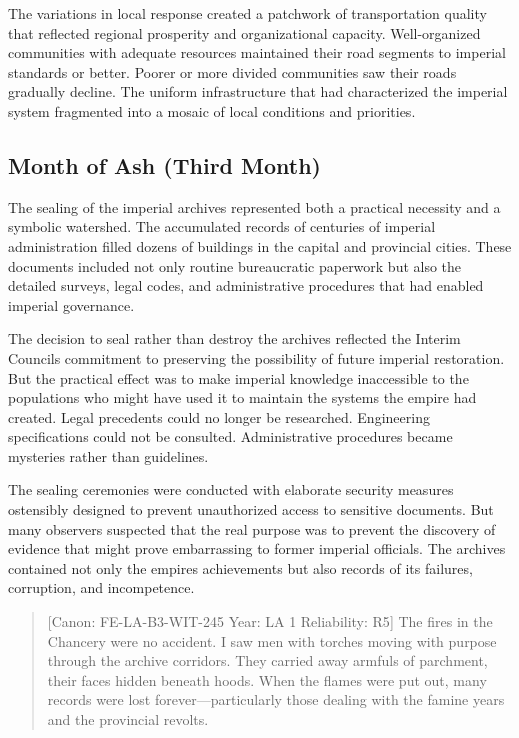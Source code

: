 The variations in local response created a patchwork of transportation
quality that reflected regional prosperity and organizational capacity.
Well-organized communities with adequate resources maintained their road
segments to imperial standards or better. Poorer or more divided
communities saw their roads gradually decline. The uniform
infrastructure that had characterized the imperial system fragmented
into a mosaic of local conditions and priorities.

\subsection{Month of Ash (Third Month)}\label{month-of-ash-third-month}

The sealing of the imperial archives represented both a practical
necessity and a symbolic watershed. The accumulated records of centuries
of imperial administration filled dozens of buildings in the capital and
provincial cities. These documents included not only routine
bureaucratic paperwork but also the detailed surveys, legal codes, and
administrative procedures that had enabled imperial governance.

The decision to seal rather than destroy the archives reflected the
Interim Council\textquotesingle s commitment to preserving the
possibility of future imperial restoration. But the practical effect was
to make imperial knowledge inaccessible to the populations who might
have used it to maintain the systems the empire had created. Legal
precedents could no longer be researched. Engineering specifications
could not be consulted. Administrative procedures became mysteries
rather than guidelines.

The sealing ceremonies were conducted with elaborate security measures
ostensibly designed to prevent unauthorized access to sensitive
documents. But many observers suspected that the real purpose was to
prevent the discovery of evidence that might prove embarrassing to
former imperial officials. The archives contained not only the
empire\textquotesingle s achievements but also records of its failures,
corruption, and incompetence.

\begin{quote}
{[}Canon: FE-LA-B3-WIT-245 \textbar{} Year: LA 1 \textbar{} Reliability:
R5{]} The fires in the Chancery were no accident. I saw men with torches
moving with purpose through the archive corridors. They carried away
armfuls of parchment, their faces hidden beneath hoods. When the flames
were put out, many records were lost forever---particularly those
dealing with the famine years and the provincial revolts.
\end{quote}

